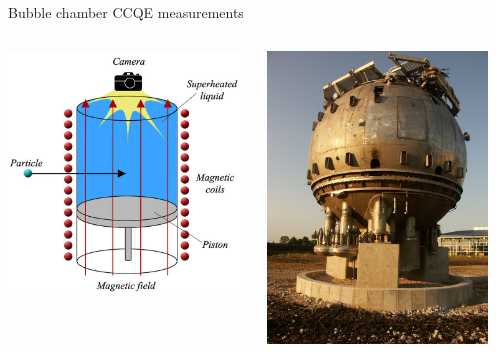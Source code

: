 \begin{frame}{Bubble chamber CCQE measurements}
\begin{columns}
\begin{column}{0.33\textwidth}
\begin{center}
     \includegraphics[width=0.98\textwidth]{./images/bc/principle_of_operation.png}\\
    \end{center}
  \end{column}
  \begin{column}{0.33\textwidth}
   \begin{center}
     \includegraphics[width=0.90\textwidth]{./images/bc/fnal_15ft.jpg}\\

\end{center}
\end{column}
\end{columns}
\end{frame}
